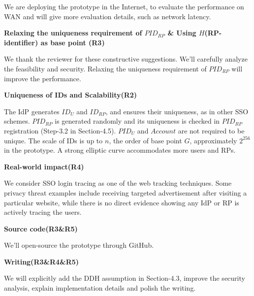 \documentclass{article}
\begin{document}
We are deploying the prototype in the Internet, to evaluate the performance on WAN and will give more evaluation details, such as network latency.


\textbf{Relaxing the uniqueness requirement of $PID_{RP}$ \& Using $H$(RP-identifier) as base point (R3)}

We thank the reviewer for these constructive suggestions. We'll carefully analyze the feasibility and security. Relaxing the uniqueness requirement of $PID_{RP}$ will improve the performance.


\textbf{Uniqueness of IDs and Scalability(R2)}

The IdP generates $ID_U$ and $ID_{RP}$, and ensures their uniqueness, as in other SSO schemes.
$PID_{RP}$ is generated randomly and its uniqueness is checked in $PID_{RP}$ registration (Step-3.2 in Section-4.5).
$PID_U$ and $Account$ are not required to be unique.
The scale of IDs is up to $n$, the order of base point $G$, approximately $2^{256}$ in the prototype.
A strong elliptic curve accommodates more users and RPs.

\textbf{Real-world impact(R4)}

We consider SSO login tracing as one of the web tracking techniques. Some privacy threat examples include receiving targeted advertisement after visiting a particular website, while there is no direct evidence showing any IdP or RP is actively tracing the users.


\textbf{Source code(R3\&R5)}

We'll open-source the prototype through GitHub.




\textbf{Writing(R3\&R4\&R5)}

We will explicitly add the DDH assumption in Section-4.3, improve the security analysis, explain implementation details and polish the writing.
\end{document}
